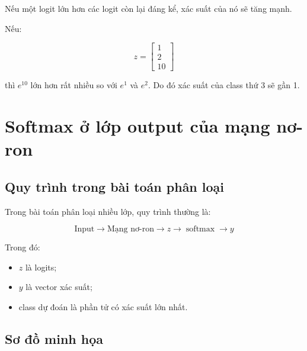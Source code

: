 \documentclass[12pt,a4paper]{report}
\begin{document}
Nếu một logit lớn hơn các logit còn lại đáng kể, xác suất của nó sẽ tăng mạnh.

\begin{vidu}
Nếu:

\[
    z =
    \begin{bmatrix}
    1\\
    2\\
    10
    \end{bmatrix}
\]

thì $e^{10}$ lớn hơn rất nhiều so với $e^1$ và $e^2$. Do đó xác suất của class thứ 3 sẽ gần 1.
\end{vidu}

\chapter{Softmax ở lớp output của mạng nơ-ron}

\section{Quy trình trong bài toán phân loại}

Trong bài toán phân loại nhiều lớp, quy trình thường là:

\[
    \text{Input}
    \rightarrow
    \text{Mạng nơ-ron}
    \rightarrow
    z
    \rightarrow
    \operatorname{softmax}
    \rightarrow
    y
\]

Trong đó:

\begin{itemize}
    \item $z$ là logits;
    \item $y$ là vector xác suất;
    \item class dự đoán là phần tử có xác suất lớn nhất.
\end{itemize}

\section{Sơ đồ minh họa}

\begin{center}
\end{center}
\end{document}
